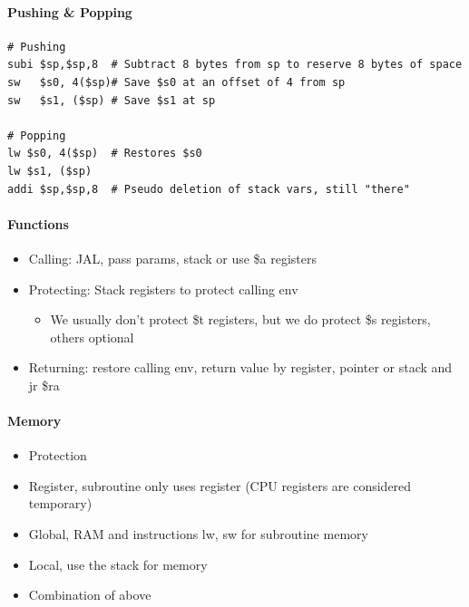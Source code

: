\documentclass[12 pt]{article}
\begin{document}
\paragraph{Pushing \& Popping}
\begin{lstlisting}
# Pushing
subi $sp,$sp,8	# Subtract 8 bytes from sp to reserve 8 bytes of space
sw   $s0, 4($sp)# Save $s0 at an offset of 4 from sp 
sw   $s1, ($sp)	# Save $s1 at sp 

# Popping
lw $s0, 4($sp)	# Restores $s0
lw $s1, ($sp)	
addi $sp,$sp,8	# Pseudo deletion of stack vars, still "there"
\end{lstlisting}
\paragraph{Functions}
\begin{itemize}
\item Calling: JAL, pass params, stack or use \$a registers
\item Protecting: Stack registers to protect calling env
\begin{itemize}
\item We usually don't protect \$t registers, but we do protect \$s registers, others optional
\end{itemize}
\item Returning: restore calling env, return value by register, pointer or stack and jr \$ra
\end{itemize}
\paragraph{Memory}
\begin{itemize}
\item Protection
\item Register, subroutine only uses register (CPU registers are considered temporary)
\item Global, RAM and instructions lw, sw for subroutine memory
\item Local, use the stack for memory
\item Combination of above
\end{itemize}
\end{document}
